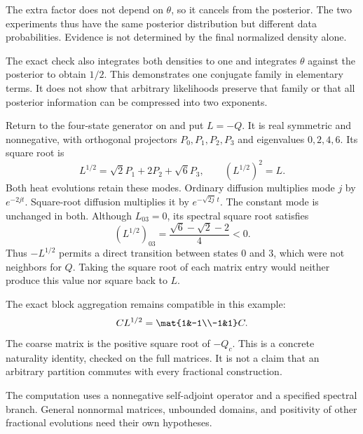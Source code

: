 The extra factor does not depend on $\theta$, so it cancels from the posterior. The two experiments thus have the same posterior distribution but different data probabilities. Evidence is not determined by the final normalized density alone.

The exact check also integrates both densities to one and integrates $\theta$ against the posterior to obtain $1/2$. This demonstrates one conjugate family in elementary terms. It does not show that arbitrary likelihoods preserve that family or that all posterior information can be compressed into two exponents.

Return to the four-state generator on  and put $L=-Q$. It is real symmetric and nonnegative, with orthogonal projectors $P_0,P_1,P_2,P_3$ and eigenvalues $0,2,4,6$. Its square root is
\[
L^{1/2}=\sqrt2P_1+2P_2+\sqrt6P_3,
\qquad (L^{1/2})^2=L.
\]
Both heat evolutions retain these modes. Ordinary diffusion multiplies mode $j$ by $e^{-2jt}$. Square-root diffusion multiplies it by $e^{-\sqrt{2j}\,t}$. The constant mode is unchanged in both.
Although $L_{03}=0$, its spectral square root satisfies
\[
(L^{1/2})_{03}=\frac{\sqrt6-\sqrt2-2}{4}<0.
\]
Thus $-L^{1/2}$ permits a direct transition between states $0$ and $3$, which were not neighbors for $Q$. Taking the square root of each matrix entry would neither produce this value nor square back to $L$.

The exact block aggregation remains compatible in this example:
\[
C L^{1/2}=\mat{1&-1\\-1&1}C.
\]
The coarse matrix is the positive square root of $-Q_c$. This is a concrete naturality identity, checked on the full matrices. It is not a claim that an arbitrary partition commutes with every fractional construction.

The computation uses a nonnegative self-adjoint operator and a specified spectral branch. General nonnormal matrices, unbounded domains, and positivity of other fractional evolutions need their own hypotheses.

